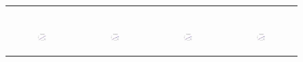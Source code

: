 \begin{figure}[ht]
\begin{tabular}{cccc}
\begin{subfigure}[b]{0.22\textwidth}
			\label{appfig:partition:runtime_it2004_setcover}
	  \end{subfigure} \\
	  \begin{subfigure}[b]{0.22\textwidth}
	  	\includegraphics[width=110pt]{images_partition/speedup_friendster_setcover.eps}
			\caption{}
			\label{appfig:partition:speedup_friendster_setcover}
	  \end{subfigure} &
	  \begin{subfigure}[b]{0.22\textwidth}
	  	\includegraphics[width=110pt]{images_partition/speedup_arabic2005_setcover.eps}
			\caption{}
			\label{appfig:partition:speedup_arabic2005_setcover}
	  \end{subfigure} &
	  \begin{subfigure}[b]{0.22\textwidth}
	  	\includegraphics[width=110pt]{images_partition/speedup_uk2005_setcover.eps}
			\caption{}
			\label{appfig:partition:speedup_uk2005_setcover}
	  \end{subfigure} &
	  \begin{subfigure}[b]{0.22\textwidth}
	  	\includegraphics[width=110pt]{images_partition/speedup_it2004_setcover.eps}

\end{subfigure}
\end{tabular}
\end{figure}
